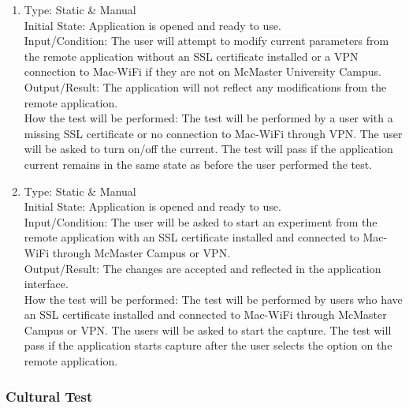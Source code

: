 \documentclass[12pt, titlepage]{article}
\begin{document}
\begin{adjustwidth}{2.2em}{0pt}
\begin{enumerate}[{NF-ST}1.]
    \item Type: Static \& Manual\\ \label{ST1}
    Initial State: Application is opened and ready to use.\\
    Input/Condition: The user will attempt to modify current parameters from the remote application without an SSL certificate installed or a VPN connection to Mac-WiFi if they are not on McMaster University Campus.\\
    Output/Result: The application will not reflect any modifications from the remote application.\\
    How the test will be performed: The test will be performed by a user with a missing SSL certificate or no connection to Mac-WiFi through VPN. The user will be asked to turn on/off the current. The test will pass if the application current remains in the same state as before the user performed the test.
    
    \item Type: Static \& Manual\\ \label{ST2}
    Initial State: Application is opened and ready to use.\\
    Input/Condition: The user will be asked to start an experiment from the remote application with an SSL certificate installed and connected to Mac-WiFi through McMaster Campus or VPN.\\
    Output/Result: The changes are accepted and reflected in the application interface.\\
    How the test will be performed: The test will be performed by users who have an SSL certificate installed and connected to Mac-WiFi through McMaster Campus or VPN. The users will be asked to start the capture. The test will pass if the application starts capture after the user selects the option on the remote application.
\end{enumerate}
\end{adjustwidth}

\subsubsection{Cultural Test}
\end{document}
